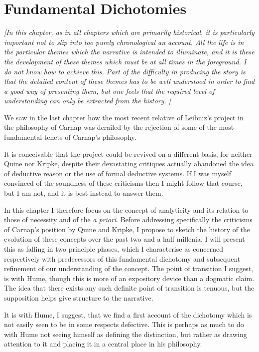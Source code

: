 \chapter{Fundamental Dichotomies}\label{FundamentalDichotomies}

\emph{[In this chapter, as in all chapters which are primarily
    historical, it is particularly important not to slip into too
    purely chronological an account. 
All the life is in the particular themes which the narrative is
intended to illuminate, and it is these the development of these
themes which must be at all times in the foreground. 
I do not know how to achieve this.
Part of the difficulty in producing the story is that the detailed
content of these themes has to be well understood in order to find a
good way of presenting them, but one feels that the required level of
understanding can only be extracted from the history. 
]}

We saw in the last chapter how the most recent relative of Leibniz's
project in the philosophy of Carnap was derailed by the rejection of
some of the most fundamental tenets of Carnap's philosophy.

It is conceivable that the project could be revived on a different
basis, for neither Quine nor Kripke, despite their devastating
critiques actually abandoned the idea of deductive reason or the use
of formal deductive systems.
If I was myself convinced of the soundness of these criticisms then I
might follow that course, but I am not, and it is best instead to
answer them.

In this chapter I therefore focus on the concept of analyticity and
its relation to those of necessity and of the \emph{a priori}.
Before addressing specifically the criticisms of Carnap's position by
Quine and Kripke, I propose to sketch the history of the evolution of
these concepts over the past two and a half millenia.
I will present this as falling in two principle phases, which I
characterise as concerned respectively with predecessors of this
fundamental dichotomy and subsequent refinement of our understanding
of the concept. 
The point of transition I suggest, is with Hume, though this is more
of an expository device than a dogmatic claim.
The idea that there exists any such definite point of transition is
tenuous, but the supposition helps give structure to the narrative.

It is with Hume, I suggest, that we find a first account of the
dichotomy which is not easily seen to be in some respects defective. 
This is perhaps as much to do with Hume not seeing himself as defining
the distinction, but rather as drawing attention to it and placing it
in a central place in his philosophy. 

